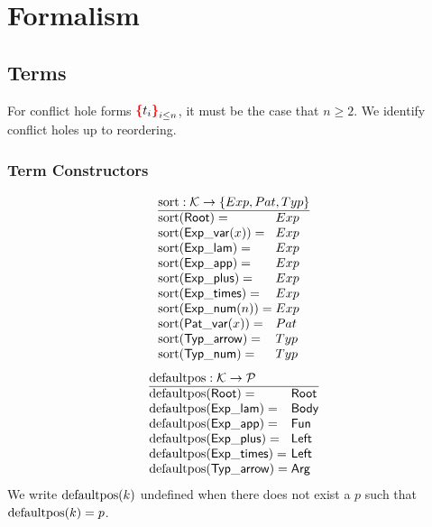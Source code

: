 \section{Formalism}


\subsection{Terms}

\figureTermSyntaxContent

For conflict hole forms $\conflictHole{t_i}_{i \leq n}$, it must be the case that $n \geq 2$.
We identify conflict holes up to reordering.


\subsubsection{Term Constructors}

\[
  \arraycolsep=0pt
  \begin{array}{ll}
    \multicolumn{2}{l}{\sortOp : \K \to \SetOf{Exp, Pat, Typ}} \\
    \hline
    \sort{\Root}={} & Exp \\
    \sort{\ExpVar(x)}={} & Exp \\
    \sort{\ExpLam}={} & Exp \\
    \sort{\ExpApp}={} & Exp \\
    \sort{\ExpPlus}={} & Exp \\
    \sort{\ExpTimes}={} & Exp \\
    \sort{\ExpNum(n)}={} & Exp \\
    \sort{\PatVar(x)}={} & Pat \\
    \sort{\TypArrow}={} & Typ \\
    \sort{\TypNum}={} & Typ \\
  \end{array}
\]
%
\figureArityContent
%
\[
  \arraycolsep=0pt
  \begin{array}{ll}
    \multicolumn{2}{l}{\defaultposOp : \K \to \P} \\
    \hline
    \defaultpos{\Root}={} & \Root \\
    \defaultpos{\ExpLam}={} & \LamBody \\
    \defaultpos{\ExpApp}={} & \AppFun \\
    \defaultpos{\ExpPlus}={} & \PlusLeft \\
    \defaultpos{\ExpTimes}={} & \TimesLeft \\
    \defaultpos{\TypArrow}={} & \ArrowArg \\
  \end{array}
\]
%
We write $\operatorname{\text{defaultpos}}\mathopen{}\left(k\right)\mathclose{}$ undefined when there does not exist a $p$ such that $\operatorname{\text{defaultpos}}\mathopen{}\left(k\right)\mathclose{} = p$.

